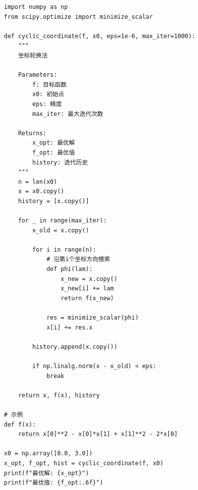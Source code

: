 \begin{codebox}[坐标轮换法]
\begin{lstlisting}
import numpy as np
from scipy.optimize import minimize_scalar

def cyclic_coordinate(f, x0, eps=1e-6, max_iter=1000):
    """
    坐标轮换法
    
    Parameters:
        f: 目标函数
        x0: 初始点
        eps: 精度
        max_iter: 最大迭代次数
    
    Returns:
        x_opt: 最优解
        f_opt: 最优值
        history: 迭代历史
    """
    n = len(x0)
    x = x0.copy()
    history = [x.copy()]
    
    for _ in range(max_iter):
        x_old = x.copy()
        
        for i in range(n):
            # 沿第i个坐标方向搜索
            def phi(lam):
                x_new = x.copy()
                x_new[i] += lam
                return f(x_new)
            
            res = minimize_scalar(phi)
            x[i] += res.x
        
        history.append(x.copy())
        
        if np.linalg.norm(x - x_old) < eps:
            break
    
    return x, f(x), history

# 示例
def f(x):
    return x[0]**2 - x[0]*x[1] + x[1]**2 - 2*x[0]

x0 = np.array([0.0, 3.0])
x_opt, f_opt, hist = cyclic_coordinate(f, x0)
print(f"最优解: {x_opt}")
print(f"最优值: {f_opt:.6f}")
\end{lstlisting}
\end{codebox}

